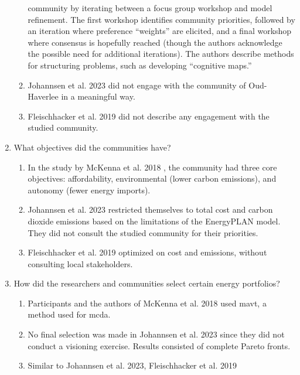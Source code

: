 \begin{enumerate}
\begin{enumerate}
        community by iterating between a focus group workshop and model
        refinement. The first workshop identifies community priorities, followed
        by an iteration where preference ``weights'' are elicited, and a final
        workshop where consensus is hopefully reached (though the authors
        acknowledge the possible need for additional iterations). The authors
        describe methods for structuring problems, such as developing
        ``cognitive maps.''
        \item Johannsen et al. 2023 \cite{johannsen_municipal_2023} did not
        engage with the community of Oud-Haverlee in a meaningful way.
        \item Fleischhacker et al. 2019 \cite{fleischhacker_portfolio_2019} did
        not describe any engagement with the studied community.
    \end{enumerate}
    \item What objectives did the communities have?
    \begin{enumerate}
        \item In the study by McKenna et al. 2018 \cite{mckenna_combining_2018},
        the community had three core objectives: affordability, environmental
        (lower carbon emissions), and autonomy (fewer energy imports).
        \item Johannsen et al. 2023 \cite{johannsen_municipal_2023} restricted
        themselves to total cost and carbon dioxide emissions based on the
        limitations of the EnergyPLAN model. They did not consult the studied
        community for their priorities.
        \item Fleischhacker et al. 2019 \cite{fleischhacker_portfolio_2019}
        optimized on cost and emissions, without consulting local stakeholders.
    \end{enumerate}
    \item How did the researchers and communities select certain energy
    portfolios?
    \begin{enumerate}
        \item Participants and the authors of McKenna et al. 2018
        \cite{mckenna_combining_2018} used \ac{mavt}, a method used for
        \ac{mcda}.
        \item No final selection was made in Johannsen et al. 2023
        \cite{johannsen_municipal_2023} since they did not conduct a visioning
        exercise. Results consisted of complete Pareto fronts.
        \item Similar to Johannsen et al. 2023, Fleischhacker et al. 2019

\end{enumerate}
\end{enumerate}
